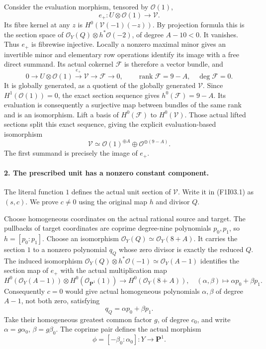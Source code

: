 Consider the evaluation morphism, tensored by $\mathcal O(1)$,
\[
       e_+:U\otimes\mathcal O(1)\longrightarrow\mathcal V.
\]
Its fibre kernel at any $z$ is
$H^0(\mathcal V(-1)(-z))$. By projection formula this is
the section space of $\mathcal O_Y(Q)\otimes h^*\mathcal O(-2)$,
of degree $A-10<0$. It vanishes. Thus $e_+$ is fibrewise
injective. Locally a nonzero maximal minor gives an invertible
minor and elementary row operations identify its image with
a free direct summand. Its actual cokernel $\mathcal F$ is
therefore a vector bundle, and
\[
 0\longrightarrow U\otimes\mathcal O(1)
 \xrightarrow{e_+}\mathcal V\longrightarrow\mathcal F
 \longrightarrow0,
 \qquad \operatorname{rank}\mathcal F=9-A,\quad
 \deg\mathcal F=0.
\]
It is globally generated, as a quotient of the globally
generated $\mathcal V$. Since $H^1(\mathcal O(1))=0$,
the exact section sequence gives $h^0(\mathcal F)=9-A$.
Its evaluation is consequently a surjective map between
bundles of the same rank and is an isomorphism.
Lift a basis of $H^0(\mathcal F)$ to $H^0(\mathcal V)$.
Those actual lifted sections split this exact sequence,
giving the explicit evaluation-based isomorphism
\[
       \mathcal V\simeq
          \mathcal O(1)^{\oplus A}\oplus
          \mathcal O^{\oplus(9-A)}.                 \tag{F1I03.1}
\]
The first summand is precisely the image of $e_+$.

\paragraph{2. The prescribed unit has a nonzero constant component.}
The literal function $1$ defines the actual unit section of
$\mathcal V$. Write it in (F1I03.1) as $(s,c)$.
We prove $c\ne0$ using the original map $h$ and divisor $Q$.

Choose homogeneous coordinates on the actual rational source
and target. The pullbacks of target coordinates are coprime
degree-nine polynomials $p_0,p_1$, so $h=[p_0:p_1]$.
Choose an isomorphism $\mathcal O_Y(Q)\simeq\mathcal O_Y(8+A)$.
It carries the section $1$ to a nonzero polynomial $q_Q$
whose zero divisor is exactly the reduced $Q$.
The induced isomorphism
$\mathcal O_Y(Q)\otimes h^*\mathcal O(-1)
 \simeq\mathcal O_Y(A-1)$ identifies the section map of
$e_+$ with the actual multiplication map
\[
 H^0(\mathcal O_Y(A-1))\otimes H^0(\mathcal O_{\mathbf P^1}(1))
 \longrightarrow H^0(\mathcal O_Y(8+A)),
 \quad (\alpha,\beta)\longmapsto\alpha p_0+\beta p_1.
\]
Consequently $c=0$ would give actual homogeneous polynomials
$\alpha,\beta$ of degree $A-1$, not both zero, satisfying
\[
                    q_Q=\alpha p_0+\beta p_1.       \tag{F1I03.2}
\]
Take their homogeneous greatest common factor $g$, of degree
$c_0$, and write $\alpha=g\alpha_0$, $\beta=g\beta_0$.
The coprime pair defines the actual morphism
\[
          \phi=[-\beta_0:\alpha_0]:Y\longrightarrow\mathbf P^1.
\]

